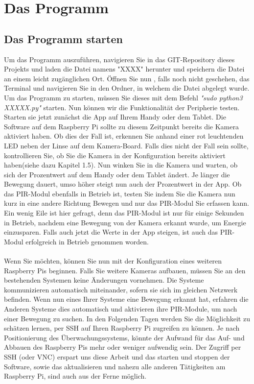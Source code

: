 \documentclass[12pt,a4paper]{scrreprt}
\begin{document}
\chapter{Das Programm}
\section{Das Programm starten}
Um das Programm auszuführen, navigieren Sie in das GIT-Repository dieses Projekts und laden die Datei namens "XXXX" herunter und speichern die Datei an einem leicht zugänglichen Ort. Öffnen Sie nun , falls noch nicht geschehen, das Terminal und navigieren Sie in den Ordner, in welchem die Datei abgelegt wurde. Um das Programm zu starten, müssen Sie dieses mit dem Befehl \textit{"sudo python3 XXXXX.py"} starten. Nun können wir die Funktionalität der Peripherie testen. Starten sie jetzt zunächst die App auf Ihrem Handy oder dem Tablet. Die Software auf dem Raspberry Pi sollte zu diesem Zeitpunkt bereits die Kamera aktiviert haben. Ob dies der Fall ist, erkennen Sie anhand einer rot leuchtenden LED neben der Linse auf dem Kamera-Board. Falls dies nicht der Fall sein sollte, kontrollieren Sie, ob Sie die Kamera in der Konfiguration bereits aktiviert haben(siehe dazu Kapitel 1.5). Nun winken Sie in die Kamera und warten, ob sich der Prozentwert auf dem Handy oder dem Tablet ändert. Je länger die Bewegung dauert, umso höher steigt nun auch der Prozentwert in der App. Ob das PIR-Modul ebenfalls in Betrieb ist, testen Sie indem Sie die Kamera nun kurz in eine andere Richtung Bewegen und nur das PIR-Modul Sie erfassen kann. Ein wenig Eile ist hier gefragt, denn das PIR-Modul ist nur für einige Sekunden in Betrieb, nachdem eine Bewegung von der Kamera erkannt wurde, um Energie einzusparen. Falls auch jetzt die Werte in der App steigen, ist auch das PIR-Modul erfolgreich in Betrieb genommen worden.\\ \\Wenn Sie möchten, können Sie nun mit der Konfiguration eines weiteren Raspberry Pis beginnen. Falls Sie weitere Kameras aufbauen, müssen Sie an den bestehenden Systemen keine Änderungen vornehmen. Die Systeme kommunizieren automatisch miteinander, sofern sie sich im gleichen Netzwerk befinden. Wenn nun eines Ihrer Systeme eine Bewegung erkannt hat, erfahren die Anderen Systeme dies automatisch und aktivieren ihre PIR-Module, um nach einer Bewegung zu suchen. In den Folgenden Tagen werden Sie die Möglichkeit zu schätzen lernen, per SSH auf Ihren Raspberry Pi zugreifen zu können. Je nach Positionierung des Überwachungssystems, könnte der Aufwand für das Auf- und Abbauen des Raspberry Pis mehr oder weniger aufwendig sein. Der Zugriff per SSH (oder VNC) erspart uns diese Arbeit und das starten und stoppen der Software, sowie das aktualisieren und nahezu alle anderen Tätigkeiten am Raspberry Pi, sind auch aus der Ferne möglich.
\end{document}

